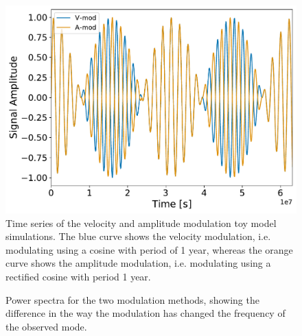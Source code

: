 \begin{figure}[!ht]
	\centering
	\includegraphics[width=0.65\columnwidth]{modulation_plot.pdf}
	\caption{Time series of the velocity and amplitude modulation toy model simulations. The blue curve shows the velocity modulation, i.e. modulating using a cosine with period of 1 year, whereas the orange curve shows the amplitude modulation, i.e. modulating using a rectified cosine with period 1 year.}  \label{fig:modulation}
\end{figure}

\begin{figure}[!ht]
	\centering
	\qquad
	\caption{Power spectra for the two modulation methods, showing the difference in the way the modulation has changed the frequency of the observed mode.}  \label{fig:modulation_PSDs}
\end{figure}

